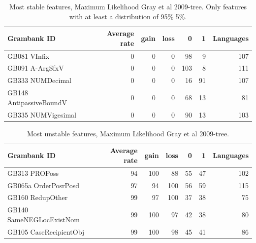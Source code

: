 \documentclass[draft,10pt]{article} %
\begin{document}
\begin{table}[H]
\centering
\begin{tabular}{lrrrrrr}
  \hline
Grambank ID & Average rate & gain & loss & 0 & 1 & Languages \\ 
  \hline
GB081 VInfix & 0 & 0 & 0 & 98 & 9 & 107 \\ 
  GB091 A-ArgSfxV & 0 & 0 & 0 & 103 & 8 & 111 \\ 
  GB333 NUMDecimal & 0 & 0 & 0 & 16 & 91 & 107 \\ 
  GB148 AntipassiveBoundV & 0 & 0 & 0 & 68 & 13 & 81 \\ 
  GB335 NUMVigesimal & 0 & 0 & 0 & 90 & 13 & 103 \\ 
   \hline
\end{tabular}
\caption{Most stable features, Maximum Likelihood Gray et al 2009-tree. Only features with at least a distribution of 95\% \/ 5\%.} 
\label{stable_ML_gray_5}
\end{table}

\begin{table}[H]
\centering
\begin{tabular}{lrrrrrr}
  \hline
Grambank ID & Average rate & gain & loss & 0 & 1 & Languages \\ 
  \hline
GB313 PROPoss & 94 & 100 & 88 & 55 & 47 & 102 \\ 
  GB065a OrderPosrPosd & 97 & 94 & 100 & 56 & 59 & 115 \\ 
  GB160 RedupOther & 99 & 97 & 100 & 37 & 38 & 75 \\ 
  GB140 SameNEGLocExistNom & 99 & 100 & 97 & 42 & 38 & 80 \\ 
  GB105 CaseRecipientObj & 99 & 100 & 98 & 45 & 41 & 86 \\ 
   \hline
\end{tabular}
\caption{Most unstable features, Maximum Likelihood Gray et al 2009-tree.} 
\label{unstable_ML_gray}
\end{table}

%
%
%
%
%
\end{document}
